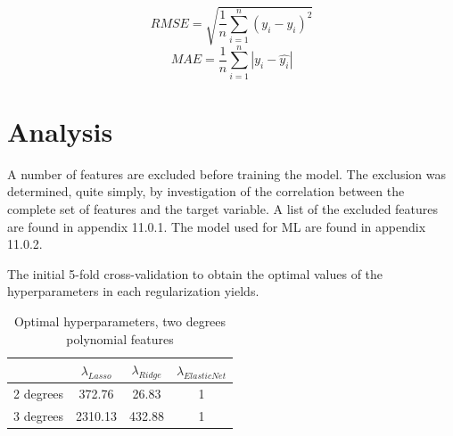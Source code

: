 \documentclass[12pt,a4paper]{article}
\begin{document}
$$ RMSE = \sqrt{\frac{1}{n}\sum_{i=1}^{n}(y_i-\hat{y_i})^2}$$
$$ MAE = \frac{1}{n}\sum_{i=1}^{n}|y_i-\hat{y_i}|$$



\section{Analysis}
A number of features are excluded before training the model. The exclusion was determined, quite simply, by investigation of the correlation between the complete set of features and the target variable. A list of the excluded features are found in appendix 11.0.1. The model used for ML are found in appendix 11.0.2.  

The initial 5-fold cross-validation to obtain the optimal values of the hyperparameters in each regularization yields. 
\begin{table}[h!]
\begin{center}
\caption{Optimal hyperparameters, two degrees polynomial features\label{time}}
\begin{tabular}{ c | c  c  c } 
  & $\lambda_{Lasso}$ & $\lambda_{Ridge}$ &  $\lambda_{Elastic Net}$ \\ \hline
2 degrees  & 372.76 & 26.83 & 1 \\ \hline
3 degrees  & 2310.13 & 432.88 & 1
\end{tabular}
\end{center}
\end{table} 
\end{document}
